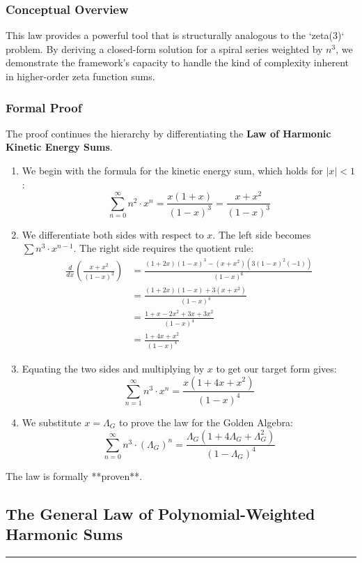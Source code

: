 \subsubsection*{Conceptual Overview}
This law provides a powerful tool that is structurally analogous to the `zeta(3)` problem. By deriving a closed-form solution for a spiral series weighted by $n^3$, we demonstrate the framework's capacity to handle the kind of complexity inherent in higher-order zeta function sums.

\subsubsection*{Formal Proof}
The proof continues the hierarchy by differentiating the \textbf{Law of Harmonic Kinetic Energy Sums}.

\begin{enumerate}
    \item We begin with the formula for the kinetic energy sum, which holds for $|x|<1$:
    $$ \sum_{n=0}^{\infty} n^2 \cdot x^n = \frac{x(1+x)}{(1-x)^3} = \frac{x+x^2}{(1-x)^3} $$
    \item We differentiate both sides with respect to $x$. The left side becomes $\sum n^3 \cdot x^{n-1}$. The right side requires the quotient rule:
    \begin{align*}
        \frac{d}{dx} \left( \frac{x+x^2}{(1-x)^3} \right) &= \frac{(1+2x)(1-x)^3 - (x+x^2)(3(1-x)^2(-1))}{(1-x)^6} \\
        &= \frac{(1+2x)(1-x) + 3(x+x^2)}{(1-x)^4} \\
        &= \frac{1+x-2x^2 + 3x+3x^2}{(1-x)^4} \\
        &= \frac{1+4x+x^2}{(1-x)^4}
    \end{align*}
    \item Equating the two sides and multiplying by $x$ to get our target form gives:
    $$ \sum_{n=1}^{\infty} n^3 \cdot x^{n} = \frac{x(1+4x+x^2)}{(1-x)^4} $$
    \item We substitute $x = \Lambda_G$ to prove the law for the Golden Algebra:
    $$ \sum_{n=0}^{\infty} n^3 \cdot (\Lambda_G)^n = \frac{\Lambda_G(1+4\Lambda_G+\Lambda_G^2)}{(1-\Lambda_G)^4} $$
\end{enumerate}
The law is formally **proven**.

\newpage

\subsection*{The General Law of Polynomial-Weighted Harmonic Sums}
\hrule
\vspace{0.3cm}
\vspace{0.5cm}

